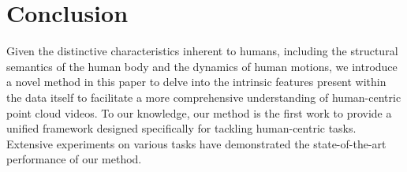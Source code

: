\section{Conclusion}
Given the distinctive characteristics inherent to humans, including the structural semantics of the human body and the dynamics of human motions, we introduce a novel method in this paper to delve into the intrinsic features present within the data itself to facilitate a more comprehensive understanding of human-centric point cloud videos. To our knowledge, our method is the first work to provide a unified framework designed specifically for tackling human-centric tasks. Extensive experiments on various tasks have demonstrated the state-of-the-art performance of our method.  
